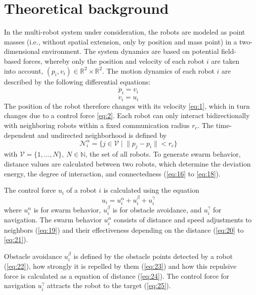 \documentclass[conference]{IEEEtran}
\begin{document}
\section{Theoretical background}
In the multi-robot system under consideration, the robots are modeled as point masses 
(i.e., without spatial extension, only by position and mass point) in a 
two-dimensional environment. The system dynamics are based on potential field-based 
forces, whereby only the position and velocity of each robot $i$ are taken into account,
$(p_i, v_i) \in \mathbb{R}^2 \times \mathbb{R}^2$.
The motion dynamics of each robot $i$ are described by the following differential equations:
\begin{equation}
    \dot{p}_i = v_i
    \label{eq:1}
\end{equation}
\begin{equation}
    \dot{v}_i = u_i
    \label{eq:2}
\end{equation}
The position of the robot therefore changes with its velocity \eqref{eq:1}, which in turn changes 
due to a control force \eqref{eq:2}.
Each robot can only interact bidirectionally with neighboring robots within a fixed 
communication radius $r_c$. The time-dependent and undirected 
neighborhood is defined by
\begin{equation}
    \mathcal{N}_i^\alpha = \{ j \in \mathcal{V} \; | \; \| p_j - p_i \| < r_c \}
    \label{eq:3}
\end{equation}
with $\mathcal{V} = \{1, \ldots, N\},\ N \in \mathbb{N}$, the set of all robots.
To generate swarm behavior, distance values are calculated between two robots, 
which determine the deviation energy, the degree of interaction, and connectedness 
(\eqref{eq:16} to \eqref{eq:18}).

The control force $u_i$ of a robot $i$ is calculated using the equation
\begin{equation}
    u_i = u_i^\alpha + u_i^\beta + u_i^\gamma
    \label{eq:4}
\end{equation}
where $u_i^\alpha$ is for swarm behavior, $u_i^\beta$ is for 
obstacle avoidance, and $u_i^\gamma$ for navigation. The swarm behavior 
$u_i^\alpha$ consists of distance and speed adjustments to neighbors 
(\eqref{eq:19}) 
and their effectiveness depending on the distance 
(\eqref{eq:20} to \eqref{eq:21}).

Obstacle avoidance $u_i^\beta$ is defined by the obstacle points 
detected by a robot (\eqref{eq:22}), how strongly it is repelled by them 
(\eqref{eq:23}) and how this repulsive force is calculated as a equation of distance 
(\eqref{eq:24}). The control force for navigation $u_i^\gamma$ 
attracts the robot to the target (\eqref{eq:25}).
\end{document}
